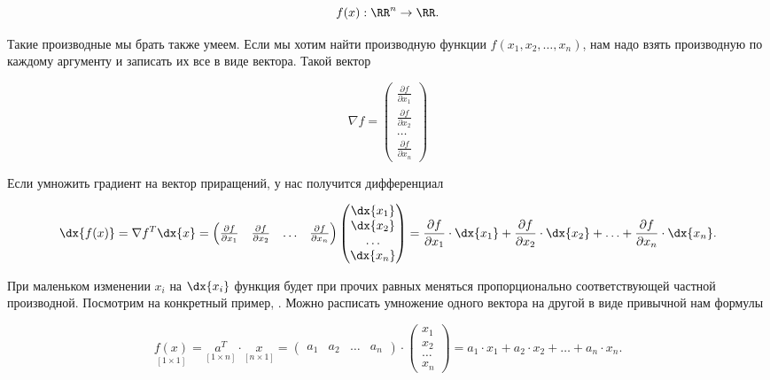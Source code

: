 \begin{sol}
\begin{enumerate}
\[
f(x) : \RR^n \to \RR.
\]

Такие производные мы брать также умеем. Если мы хотим найти производную функции $f(x_1, x_2, \ldots, x_n)$, нам надо взять производную по каждому аргументу и записать их все в виде вектора. Такой вектор  

\[
\nabla f = \begin{pmatrix} \frac{\partial f}{\partial x_1} \\ \frac{\partial f}{\partial x_2} \\ \ldots  \\ \frac{\partial f}{\partial x_n} \end{pmatrix}
\]

Если умножить градиент на вектор приращений, у нас получится дифференциал

\[
\dx{f(x)} = \nabla f^T \dx{x} = \begin{pmatrix} \frac{\partial f}{\partial x_1} & \frac{\partial f}{\partial x_2} & \ldots  & \frac{\partial f}{\partial x_n} \end{pmatrix} \begin{pmatrix} \dx{x_1} \\ \dx{x_2} \\ \ldots  \\ \dx{x_n} \end{pmatrix} = \frac{\partial f}{\partial x_1} \cdot \dx{x_1} + \frac{\partial f}{\partial x_2} \cdot \dx{x_2} + \ldots +\frac{\partial f}{\partial x_n} \cdot \dx{x_n}.
\]

При маленьком изменении $x_i$ на $\dx{x_i}$ функция будет при прочих равных меняться пропорционально соответствующей частной производной. Посмотрим на конкретный пример, . Можно расписать умножение одного вектора на другой в виде привычной нам формулы

\begin{equation*}
\underset{[1 \times 1]}{f(x)} = \underset{[1 \times n]}{a^T} \cdot \underset{[n \times 1]}{x} = \begin{pmatrix} a_1 & a_2 & \ldots &a_n \end{pmatrix} \cdot \begin{pmatrix} x_1 \\ x_2 \\ \ldots  \\ x_n \end{pmatrix} = a_1 \cdot x_1 + a_2 \cdot x_2 + \ldots + a_n \cdot x_n.
\end{equation*} 


\end{enumerate}
\end{sol}
